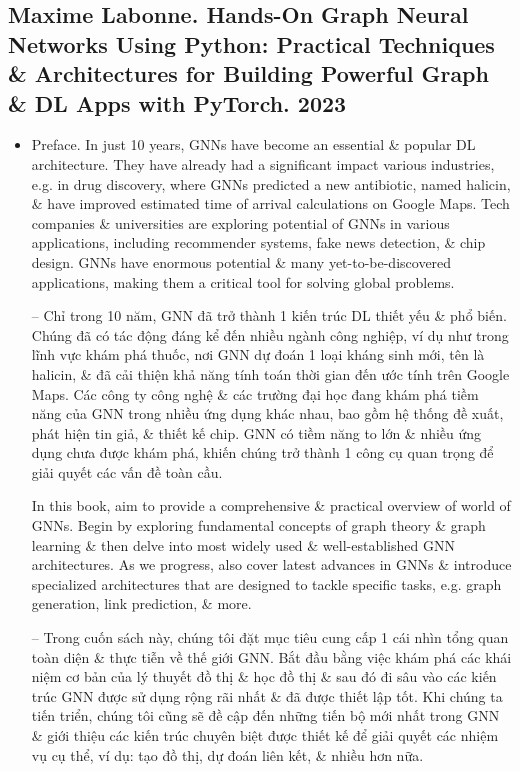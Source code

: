 \documentclass{article}
\begin{document}

\subsection{{\sc Maxime Labonne}. Hands-On Graph Neural Networks Using Python: Practical Techniques \& Architectures for Building Powerful Graph \& DL Apps with PyTorch. 2023}

\begin{itemize}
    \item {\sf Preface.} In just 10 years, GNNs have become an essential \& popular DL architecture. They have already had a significant impact various industries, e.g. in drug discovery, where GNNs predicted a new antibiotic, named halicin, \& have improved estimated time of arrival calculations on Google Maps. Tech companies \& universities are exploring potential of GNNs in various applications, including recommender systems, fake news detection, \& chip design. GNNs have enormous potential \& many yet-to-be-discovered applications, making them a critical tool for solving global problems.

    -- Chỉ trong 10 năm, GNN đã trở thành 1 kiến trúc DL thiết yếu \& phổ biến. Chúng đã có tác động đáng kể đến nhiều ngành công nghiệp, ví dụ như trong lĩnh vực khám phá thuốc, nơi GNN dự đoán 1 loại kháng sinh mới, tên là halicin, \& đã cải thiện khả năng tính toán thời gian đến ước tính trên Google Maps. Các công ty công nghệ \& các trường đại học đang khám phá tiềm năng của GNN trong nhiều ứng dụng khác nhau, bao gồm hệ thống đề xuất, phát hiện tin giả, \& thiết kế chip. GNN có tiềm năng to lớn \& nhiều ứng dụng chưa được khám phá, khiến chúng trở thành 1 công cụ quan trọng để giải quyết các vấn đề toàn cầu.

    In this book, aim to provide a comprehensive \& practical overview of world of GNNs. Begin by exploring fundamental concepts of graph theory \& graph learning \& then delve into most widely used \& well-established GNN architectures. As we progress, also cover latest advances in GNNs \& introduce specialized architectures that are designed to tackle specific tasks, e.g. graph generation, link prediction, \& more.

    -- Trong cuốn sách này, chúng tôi đặt mục tiêu cung cấp 1 cái nhìn tổng quan toàn diện \& thực tiễn về thế giới GNN. Bắt đầu bằng việc khám phá các khái niệm cơ bản của lý thuyết đồ thị \& học đồ thị \& sau đó đi sâu vào các kiến trúc GNN được sử dụng rộng rãi nhất \& đã được thiết lập tốt. Khi chúng ta tiến triển, chúng tôi cũng sẽ đề cập đến những tiến bộ mới nhất trong GNN \& giới thiệu các kiến trúc chuyên biệt được thiết kế để giải quyết các nhiệm vụ cụ thể, ví dụ: tạo đồ thị, dự đoán liên kết, \& nhiều hơn nữa.


\end{itemize}
\end{document}
